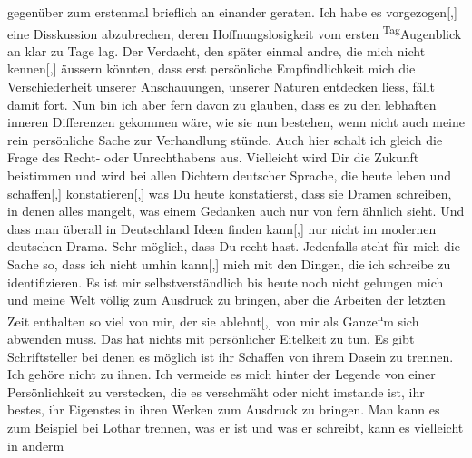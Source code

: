 \begin{ledgroupsized}[t]{13cm}
               gegenüber zum erstenmal brieflich an einander geraten. Ich habe es
                  vorgezogen{[},{]} eine Disskussion abzubrechen, deren
               Hoffnungslosigkeit vom ersten \substVorne{}\textsuperscript{Tag}\substDazwischen{}Augenblick\substHinten{} an klar zu Tage lag. Der Verdacht, den später einmal andre, die mich nicht
                  kennen{[},{]} äussern könnten, dass erst persönliche
               Empfindlichkeit mich die Verschiederheit unserer Anschauungen\introOben{},\introOben{} unserer Naturen entdecken liess, fällt damit fort. Nun bin ich aber fern
               davon zu glauben, dass es zu den lebhaften inneren Differenzen gekommen wäre, wie sie
               nun bestehen, wenn nicht auch meine rein persönliche Sache zur Verhandlung stünde.
               Auch hier schalt ich gleich die Frage des Recht- oder Unrechthabens aus. Vielleicht
               wird Dir die Zukunft beistimmen und wird bei allen Dichtern deutscher Sprache, die
               heute leben und schaffen{[},{]} konstatieren{[},{]} was
               Du heute konstatierst, dass sie Dramen schreiben, in denen alles mangelt, {\pb}was einem Gedanken auch nur von fern
               ähnlich sieht. Und dass man überall in Deutschland Ideen finden kann{[},{]} nur nicht im modernen
               deutschen Drama. Sehr möglich, dass Du recht hast. Jedenfalls steht für mich die
               Sache so, dass ich nicht umhin kann{[},{]} mich mit den Dingen, die
               ich schreibe zu identifizieren. Es ist mir selbstverständlich bis heute noch nicht
               gelungen mich und meine Welt völlig zum Ausdruck zu bringen, aber die Arbeit\introOben{}en\introOben{} der letzten Zeit enthalten so viel von mir, \label{T_L03520-4v}\label{T_L03520-4h} der sie
                  ablehnt{[},{]} von mir als Ganze\substVorne{}\textsuperscript{n}\substDazwischen{}m\substHinten{} sich abwenden muss. Das hat nichts mit persönlicher Eitelkeit zu tun. Es
               gibt Schriftsteller bei denen es möglich ist ihr Schaffen von ihrem Dasein zu
               trennen. Ich gehöre nicht zu ihnen. Ich vermeide es mich hinter der Legende von einer
               Persönlichkeit zu verstecken, die es verschmäht oder nicht imstande ist, ihr bestes,
               ihr Eigenstes in ihren Werken zum Ausdruck zu bringen. Man kann es zum Beispiel {\pb}bei Lothar trennen, was er ist und was er schreibt, kann es vielleicht in anderm

\end{ledgroupsized}
